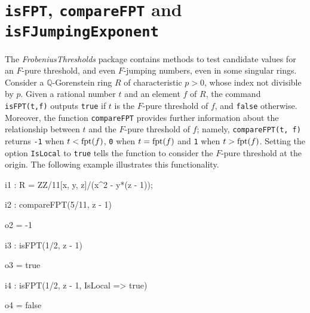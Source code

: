 \documentclass{amsart}
\begin{document}
%
%

\section{{\tt isFPT}, {\tt compareFPT} and {\tt isFJumpingExponent}}
\label{sec.IsFPT}

The \emph{FrobeniusThresholds} package contains methods to
 test candidate values for an $F$-pure threshold, and even $F$-jumping numbers, even in some singular rings.
Consider a  $\mathbb{Q}$-Gorenstein ring $R$ of characteristic $p>0$, whose index not divisible by $p$.
Given a rational number $t$ and an element $f$ of $R$, the command {\tt isFPT(t,f)} outputs {\tt true} if $t$ is the $F$-pure threshold of $f$, and {\tt false} otherwise.
Moreover, the function {\tt compareFPT} provides further information about the relationship between $t$ and the $F$-pure threshold of $f$; namely,
{\tt compareFPT(t, f)} returns {\tt-1} when $t < \operatorname{{fpt}}(f)$, {\tt 0} when $t = \operatorname{{fpt}}(f)$ and {\tt 1} when $t > \operatorname{{fpt}}(f)$.
Setting the option {\tt IsLocal} to {\tt true} tells the function to consider the $F$-pure threshold at the origin.
The following example illustrates this functionality.

{\small
{}
\begin{MyVerbatim}

i1 : R = ZZ/11[x, y, z]/(x^2 - y*(z - 1));

i2 : compareFPT(5/11, z - 1)

o2 = -1

i3 : isFPT(1/2, z - 1)

o3 = true

i4 : isFPT(1/2, z - 1, IsLocal => true)

o4 = false
\end{MyVerbatim}
}
\medspace
\end{document}
